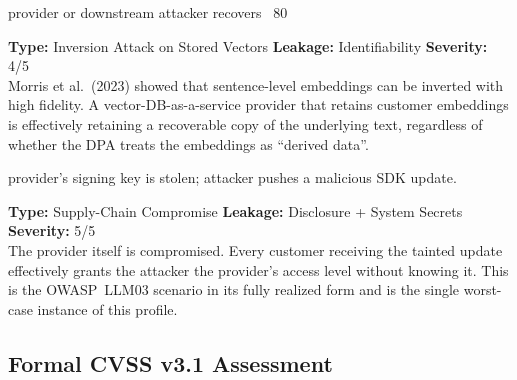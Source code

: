 \documentclass[a4paper,12pt]{report}
\begin{document}
\vspace{4pt}
\begin{attackbox}
  provider or downstream attacker recovers
        ~80%
\end{attackbox}
\begin{prosebox}
\small\textbf{Type:} Inversion Attack on Stored Vectors \quad
\textbf{Leakage:} Identifiability \quad \textbf{Severity:} 4/5\\[2pt]
Morris et al.\ (2023) showed that sentence-level embeddings can be inverted
with high fidelity. A vector-DB-as-a-service provider that retains
customer embeddings is effectively retaining a recoverable copy of the
underlying text, regardless of whether the DPA treats the embeddings as
``derived data''.
\end{prosebox}

\vspace{4pt}
\begin{attackbox}
  provider's signing key is stolen;
        attacker pushes a malicious SDK update.
\end{attackbox}
\begin{prosebox}
\small\textbf{Type:} Supply-Chain Compromise \quad
\textbf{Leakage:} Disclosure + System Secrets \quad \textbf{Severity:} 5/5\\[2pt]
The provider itself is compromised. Every customer receiving the tainted
update effectively grants the attacker the provider's access level
without knowing it. This is the OWASP~LLM03 scenario in its fully
realized form and is the single worst-case instance of this profile.
\end{prosebox}

\subsection{Formal CVSS v3.1 Assessment}
\end{document}
